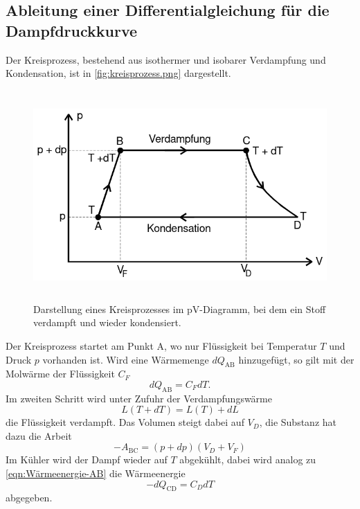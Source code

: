 \subsection{Ableitung einer Differentialgleichung für die Dampfdruckkurve}
\label{sec:Ableitung einer Differentialgleichung für die Dampfdruckkurve}
Der Kreisprozess, bestehend aus isothermer und isobarer Verdampfung und Kondensation, ist
in \autoref{fig:kreisprozess.png} dargestellt.
\begin{figure}[H]
	\centering
	\includegraphics[height=8cm]{images/kreisprozess.png}
	\caption{Darstellung eines Kreisprozesses im pV-Diagramm, bei dem ein Stoff verdampft und wieder
	kondensiert. \cite{anleitung}}
	\label{fig:kreisprozess.png}
\end{figure}
Der Kreisprozess startet am Punkt A, wo nur Flüssigkeit bei Temperatur $T$ und Druck $p$
vorhanden ist. Wird eine Wärmemenge $dQ_\text{AB}$ hinzugefügt, so gilt mit der Molwärme
der Flüssigkeit $C_F$ 
\begin{equation}
	dQ_\text{AB} = C_F dT.
	\label{eqn:Wärmeenergie-AB}
\end{equation}
Im zweiten Schritt wird unter Zufuhr der Verdampfungswärme
\[
	L(T + dT) = L(T) + dL
\]
die Flüssigkeit verdampft. Das Volumen steigt dabei auf $V_D$, die Substanz hat dazu die
Arbeit
\[
	-A_\text{BC} = (p + dp)(V_D + V_F)
\]
Im Kühler wird der Dampf wieder auf $T$ abgekühlt, dabei wird analog zu \autoref{eqn:Wärmeenergie-AB}
die Wärmeenergie 
\[
	-dQ_\text{CD} = C_D dT
\]
abgegeben.
\\

